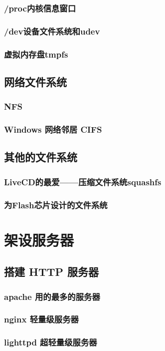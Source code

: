 \documentclass[amstex,twoside]{ctexbook}
\begin{document}
\subsection{/proc内核信息窗口}
\subsection{/dev设备文件系统和udev}
\subsection{虚拟内存盘tmpfs}
\section{网络文件系统	}
\subsection{NFS}
\subsection{Windows 网络邻居 CIFS}
\section{  其他的文件系统	}
\subsection{  LiveCD的最爱——压缩文件系统squashfs}
\subsection{  为Flash芯片设计的文件系统}

\chapter{架设服务器}
\section{  搭建 HTTP 服务器}
\subsection{  apache 用的最多的服务器}
\subsection{ nginx 轻量级服务器}
\subsection{ lighttpd 超轻量级服务器}
\end{document}
